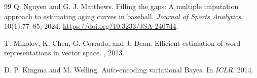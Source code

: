 \documentclass[10pt,twocolumn,letterpaper]{article}
\begin{document}
\begin{thebibliography}{99}
Q. Nguyen and G. J. Matthews.
\newblock Filling the gaps: A multiple imputation approach to estimating aging curves in baseball.
\newblock \emph{Journal of Sports Analytics}, 10(1):77--85, 2024. \url{https://doi.org/10.3233/JSA-240744}.

T. Mikolov, K. Chen, G. Corrado, and J. Dean.
\newblock Efficient estimation of word representations in vector space.
, 2013.

D. P. Kingma and M. Welling.
\newblock Auto-encoding variational Bayes.
\newblock In {\em ICLR}, 2014.

\end{thebibliography}
\end{document}
